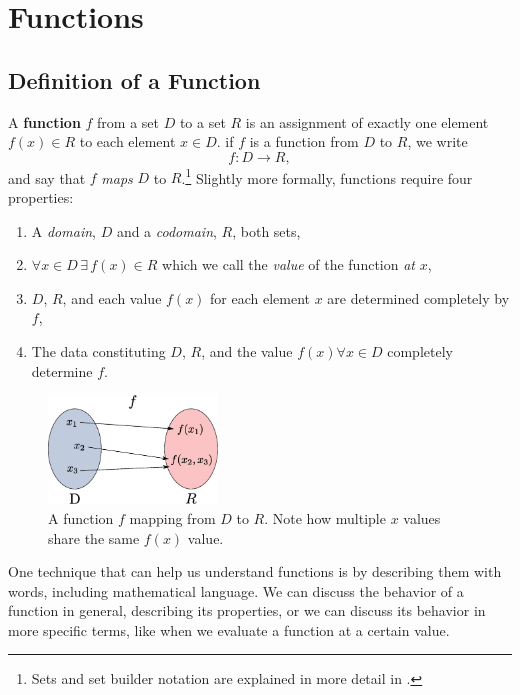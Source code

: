 \chapter{Functions}
\section{Definition of a Function}
\begin{defn}
    A \textbf{function} $f$ from a set $D$ to a set $R$ is an assignment of exactly one element $f(x) \in R$ to each element $x \in D$.
    if $f$ is a function from $D$ to $R$, we write
    \begin{equation}
        f:D \to R,
        \label{eq:function_definition}
    \end{equation}
    and say that $f$ \emph{maps} $D$ to $R$.\footnote{Sets and set builder notation are explained in more detail in .} Slightly more formally, functions require
    four properties:
    \begin{enumerate}
        \item A \emph{domain}, $D$ and a \emph{codomain}, $R$, both sets,
        \item $\forall x \in D\, \exists\, f(x) \in R$ which we call the 
              \emph{value} of the function \emph{at} $x$,
        \item $D$, $R$, and each value $f(x)$ for each element $x$ are
              determined completely by $f$,
        \item The data constituting $D$, $R$, and the value 
              $f(x) \forall x \in D$
              completely determine $f$.
    \end{enumerate}
\end{defn}
\begin{figure}[h]
    \centering
    \includegraphics[width=0.4\textwidth]{continuous/functions/function.eps}
    \caption{A function $f$ mapping from $D$ to $R$. Note how multiple $x$ 
        values share the same $f(x)$ value.}
    \label{fig:function}
\end{figure}

One technique that can help us understand functions is by describing them with words,
including mathematical language.
We can discuss the behavior of a function in general,
describing its properties, or we can discuss its behavior in more specific terms,
like when we evaluate a function at a certain value.

